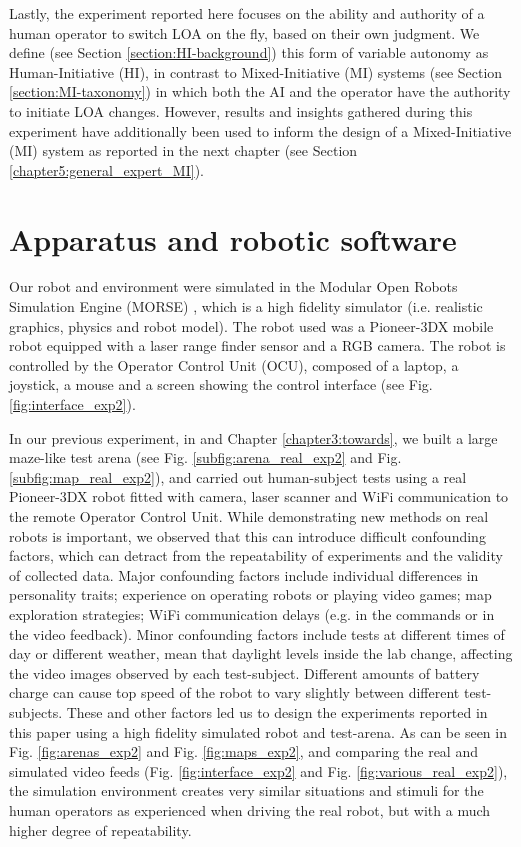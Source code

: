 \documentclass[a4paper,12pt,oneside,openright]{bhamthesis}
\begin{document}
Lastly, the experiment reported here focuses on the ability and authority of a human operator to switch LOA on the fly, based on their own judgment. We define (see Section \ref{section:HI-background}) this form of variable autonomy as Human-Initiative (HI), in contrast to Mixed-Initiative (MI) systems (see Section \ref{section:MI-taxonomy}) in which both the AI and the operator have the authority to initiate LOA changes. However, results and insights gathered during this experiment have additionally been used to inform the design of a Mixed-Initiative (MI) system as reported in the next chapter (see Section \ref{chapter5:general_expert_MI}).

\section{Apparatus and robotic software}
Our robot and environment were simulated in the Modular Open Robots Simulation Engine (MORSE) \citep{Echeverria2011}, which is a high fidelity simulator (i.e. realistic graphics, physics and robot model). The robot used was a Pioneer-3DX mobile robot equipped with a laser range finder sensor and a RGB camera. The robot is controlled by the Operator Control Unit (OCU), composed of a laptop, a joystick, a mouse and a screen showing the control interface (see Fig. \ref{fig:interface_exp2}).

In our previous experiment, in \citep{Chiou2015} and Chapter \ref{chapter3:towards}, we built a large maze-like test arena (see Fig. \ref{subfig:arena_real_exp2} and Fig. \ref{subfig:map_real_exp2}), and carried out human-subject tests using a real Pioneer-3DX robot fitted with camera, laser scanner and WiFi communication to the remote Operator Control Unit. While demonstrating new methods on real robots is important, we observed that this can introduce difficult confounding factors, which can detract from the repeatability of experiments and the validity of collected data. Major confounding factors include individual differences in personality traits; experience on operating robots or playing video games; map exploration strategies; WiFi communication delays (e.g. in the commands or in the video feedback). Minor confounding factors include tests at different times of day or different weather, mean that daylight levels inside the lab change, affecting the video images observed by each test-subject. Different amounts of battery charge can cause top speed of the robot to vary slightly between different test-subjects. These and other factors led us to design the experiments reported in this paper using a high fidelity simulated robot and test-arena. As can be seen in Fig. \ref{fig:arenas_exp2} and Fig. \ref{fig:maps_exp2}, and comparing the real and simulated video feeds (Fig. \ref{fig:interface_exp2} and Fig. \ref{fig:various_real_exp2}), the simulation environment creates very similar situations and stimuli for the human operators as experienced when driving the real robot, but with a much higher degree of repeatability.
\end{document}
